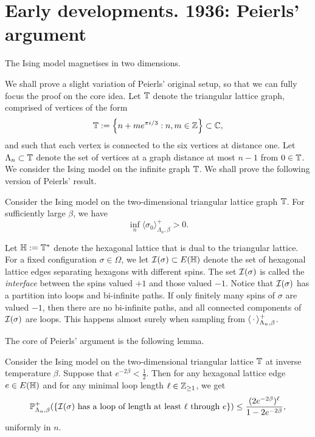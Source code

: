\section{Early developments. 1936: Peierls' argument}
\label{sec:peierls}

\begin{theorem}[Peierls, 1936]
    \label{thm:peierls}
    The Ising model magnetises in two dimensions.
\end{theorem}

We shall prove a slight variation of Peierls' original setup,
so that we can fully focus the proof on the core idea.
Let $\mathbb T$ denote the triangular lattice graph,
comprised of vertices of the form
\[
    \mathbb T:=\left\{n+m e^{\pi i/3}:n,m\in\mathbb Z \right\}\subset\mathbb C,
\]
and such that each vertex is connected to the six
vertices at distance one.
Let $\Lambda_n\subset\mathbb T$ denote the set of vertices at a graph
distance at most $n-1$ from $0\in\mathbb T$.
We consider the Ising model on the infinite graph $\mathbb T$.
We shall prove the following version of Peierls' result.

\begin{theorem}[Peierls, 1936]
    \label{thm:peierls_triangles}
    Consider the Ising model on the two-dimensional
    triangular lattice graph $\mathbb T$.
    For sufficiently large $\beta$,
    we have
    \[
        \inf_{n}\langle\sigma_0\rangle_{\Lambda_n,\beta}^+
        >0.
    \]
\end{theorem}

Let $\mathbb H:=\mathbb T^*$ denote the hexagonal lattice
that is dual to the triangular lattice.
For a fixed configuration $\sigma\in\Omega$,
we let $\mathcal I(\sigma)\subset E(\mathbb H)$ denote the set of
hexagonal lattice edges separating hexagons with different spins.
The set $\mathcal I(\sigma)$ is called the
\emph{interface} between the spins valued $+1$
and those valued $-1$.
Notice that $\mathcal I(\sigma)$ has a partition into
loops and bi-infinite paths.
If only finitely many spins of $\sigma$ are valued $-1$,
then there are no bi-infinite paths,
and all connected components of $\mathcal I(\sigma)$
are loops.
This happens almost surely when sampling from $\langle\,\cdot\,\rangle_{\Lambda_n,\beta}^+$.

The core of Peierls' argument is the following lemma.

\begin{lemma}
    \label{lem:exp_decay_ising_loops}
    Consider the Ising model on the two-dimensional triangular lattice $\mathbb T$
    at inverse temperature $\beta$.
    Suppose that $e^{-2\beta}<\frac12$.
    Then for any hexagonal lattice edge $e\in E(\mathbb H)$
    and for any minimal loop length $\ell\in\mathbb Z_{\geq 1}$,
    we get
    \[
        \P_{\Lambda_n,\beta}^+
        (\{\text{$\calI(\sigma)$ has a loop of length at least $\ell$ through $e$}\})
        \leq \frac{(2e^{-2\beta})^\ell}{1-2e^{-2\beta}},
    \]
    uniformly in $n$.
\end{lemma}

